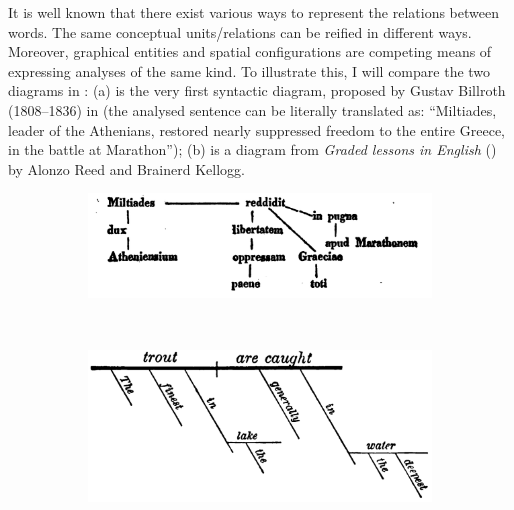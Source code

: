 \documentclass[output=paper]{langsci/langscibook}
\begin{document}
It is well known that there exist various ways to represent the relations between words. The same conceptual units/relations can be reified in different ways. Moreover, graphical entities and spatial configurations are competing means of expressing analyses of the same kind. To illustrate this, I will compare the two diagrams in : (a) is the very first syntactic diagram, proposed by Gustav Billroth (1808–1836) in \citeyear{billroth__lateinische_1832} (the analysed sentence can be literally translated as: “Miltiades, leader of the Athenians, restored nearly suppressed freedom to the entire Greece, in the battle at Marathon”); (b) is a diagram from \textit{Graded lessons in English} (\citeyear{reed_graded_1879}) by Alonzo Reed and Brainerd Kellogg.

\begin{figure}
	\caption{Various values of strokes\label{fig:4:2}}
	\begin{subfigure}[t]{\linewidth}\centering
	\caption{\label{fig:4:2a}\citealt[102]{billroth__lateinische_1832}}
	  	\includegraphics[width=.75\textwidth]{figures/04/Billroth.png}
        \end{subfigure}\medskip\\%
        \begin{subfigure}[t]{\linewidth}\centering
		\caption{\label{fig:4:2b}\citealt[62]{reed_graded_1879}}
		\includegraphics[width=.75\textwidth]{figures/04/ReedKellog.png}
	\end{subfigure}
\end{figure}
\end{document}
